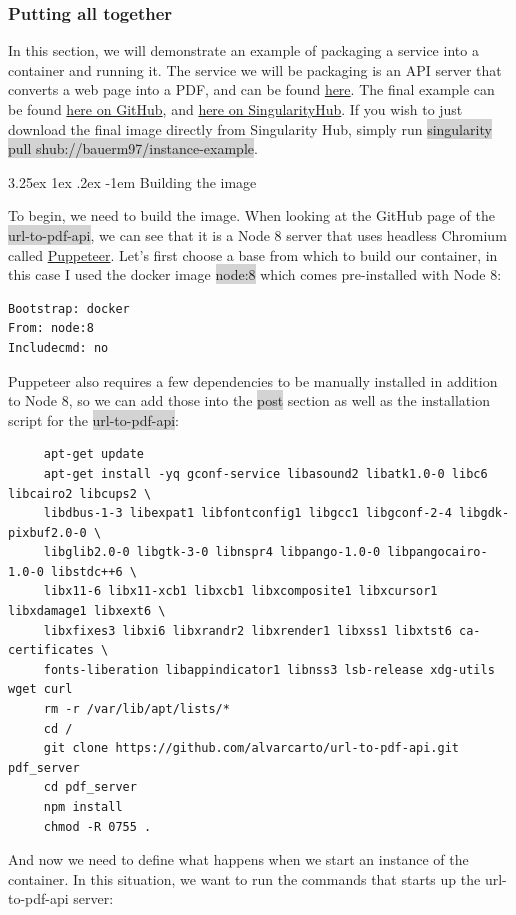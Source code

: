 \documentclass[a4paper]{article}
\makeatletter
\renewcommand\paragraph{\@startsection{paragraph}{5}{\z@}%
  {3.25ex \@plus1ex \@minus.2ex}%
  {-1em}%
  {\normalfont\normalsize\bfseries}}
\makeatother
\begin{document}
\subsubsection{Putting all together}

In this section, we will demonstrate an example of packaging a service into a container and running it. The service we will be packaging is an API server that converts a web page into a PDF, and can be found \href{https://github.com/alvarcarto/url-to-pdf-api}{here}. The final example can be found \href{https://github.com/bauerm97/instance-example}{here on GitHub}, and \href{https://singularity-hub.org/collections/bauerm97/instance-example/}{here on SingularityHub}. If you wish to just download the final image directly from Singularity Hub, simply run \colorbox{lightgray}{singularity pull shub://bauerm97/instance-example}.

	\paragraph{Building the image}

To begin, we need to build the image. When looking at the GitHub page of the \colorbox{lightgray}{url-to-pdf-api}, we can see that it is a Node 8 server that uses headless Chromium called \href{https://github.com/GoogleChrome/puppeteer}{Puppeteer}. Let’s first choose a base from which to build our container, in this case I used the docker image \colorbox{lightgray}{node:8} which comes pre-installed with Node 8:

\begin{lstlisting}[frame=single] 
Bootstrap: docker
From: node:8
Includecmd: no
\end{lstlisting}

Puppeteer also requires a few dependencies to be manually installed in addition to Node 8, so we can add those into the \colorbox{lightgray}{post} section as well as the installation script for the \colorbox{lightgray}{ url-to-pdf-api}:\\[0.1in]

\begin{lstlisting}[frame=single] 
%post
     apt-get update
     apt-get install -yq gconf-service libasound2 libatk1.0-0 libc6 libcairo2 libcups2 \
     libdbus-1-3 libexpat1 libfontconfig1 libgcc1 libgconf-2-4 libgdk-pixbuf2.0-0 \
     libglib2.0-0 libgtk-3-0 libnspr4 libpango-1.0-0 libpangocairo-1.0-0 libstdc++6 \
     libx11-6 libx11-xcb1 libxcb1 libxcomposite1 libxcursor1 libxdamage1 libxext6 \
     libxfixes3 libxi6 libxrandr2 libxrender1 libxss1 libxtst6 ca-certificates \
     fonts-liberation libappindicator1 libnss3 lsb-release xdg-utils wget curl
     rm -r /var/lib/apt/lists/*
     cd /
     git clone https://github.com/alvarcarto/url-to-pdf-api.git pdf_server
     cd pdf_server
     npm install
     chmod -R 0755 . 
\end{lstlisting}
And now we need to define what happens when we start an instance of the container. In this situation, we want to run the commands that starts up the url-to-pdf-api server:   
 
\end{document}

